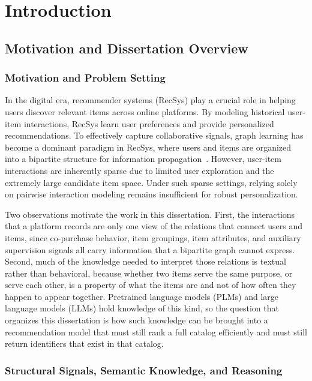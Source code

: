 \chapter{Introduction}\label{intro}
\section{Motivation and Dissertation Overview}

\subsection{Motivation and Problem Setting}

In the digital era, recommender systems (RecSys) play a crucial role in helping users discover relevant items across online platforms. By modeling historical user-item interactions, RecSys learn user preferences and provide personalized recommendations. To effectively capture collaborative signals, graph learning has become a dominant paradigm in RecSys, where users and items are organized into a bipartite structure for information propagation~\cite{glrssurvey21}. However, user-item interactions are inherently sparse due to limited user exploration and the extremely large candidate item space. Under such sparse settings, relying solely on pairwise interaction modeling remains insufficient for robust personalization.

Two observations motivate the work in this dissertation. First, the interactions that a platform records are only one view of the relations that connect users and items, since co-purchase behavior, item groupings, item attributes, and auxiliary supervision signals all carry information that a bipartite graph cannot express. Second, much of the knowledge needed to interpret those relations is textual rather than behavioral, because whether two items serve the same purpose, or serve each other, is a property of what the items are and not of how often they happen to appear together. Pretrained language models (PLMs) and large language models (LLMs) hold knowledge of this kind, so the question that organizes this dissertation is how such knowledge can be brought into a recommendation model that must still rank a full catalog efficiently and must still return identifiers that exist in that catalog.

\subsection{Structural Signals, Semantic Knowledge, and Reasoning}

